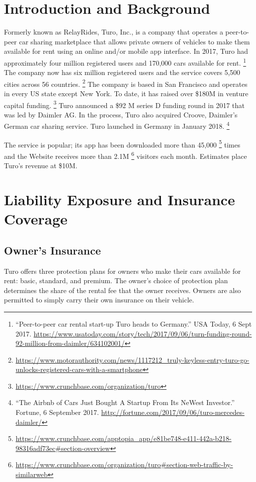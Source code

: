 \documentclass[review,12pt]{elsarticle}
\begin{document}
\section{Introduction and Background}
Formerly known as RelayRides, Turo, Inc., is a company that operates a peer-to-peer car sharing marketplace that allows private owners of vehicles to make them available for rent using an online and/or mobile app interface. In 2017, Turo had approximately four million registered users and 170,000 cars available for rent.
    \footnote{``Peer-to-peer car rental start-up Turo heads to Germany.'' USA Today, 6 Sept 2017. \url{https://www.usatoday.com/story/tech/2017/09/06/turn-funding-round-92-million-from-daimler/634102001/}
    }
The company now has six million registered users and the service covers 5,500 cities across 56 countries.
  \footnote{\url{https://www.motorauthority.com/news/1117212_truly-keyless-entry-turo-go-unlocks-registered-cars-with-a-smartphone}
  }
  The company is based in San Francisco and operates in every US state except New York. To date, it has raised over \$180M in venture capital funding.
    \footnote{\url{https://www.crunchbase.com/organization/turo}}
  Turo announced a \$92 M series D funding round in 2017 that was led by Daimler AG. In the process, Turo also acquired Croove, Daimler's German car sharing service. Turo launched in Germany in January 2018.
    \footnote{``The Airbnb of Cars Just Bought A Startup From Its NeWest Investor.'' Fortune, 6 September 2017. \url{http://fortune.com/2017/09/06/turo-mercedes-daimler/}
    }

  The service is popular; its app has been downloaded more than 45,000
  \footnote{\url{https://www.crunchbase.com/apptopia_app/e81be748-e411-442a-b218-98316adf73ec\#section-overview}}
  times and the Website receives more than 2.1M
    \footnote{\url{https://www.crunchbase.com/organization/turo\#section-web-traffic-by-similarweb}}
   visitors each month. Estimates place Turo's revenue at \$10M.


\section{Liability Exposure and Insurance Coverage}
\label{S:2}
\subsection{Owner's Insurance}
Turo offers three protection plans for owners who make their cars available for rent: basic, standard, and premium. The owner's choice of protection plan determines the share of the rental fee that the owner receives. Owners are also permitted to simply carry their own insurance on their vehicle.
\end{document}
